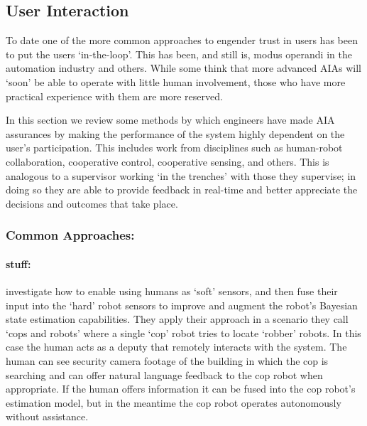 \subsection{User Interaction} \label{sec:user_interaction}
To date one of the more common approaches to engender trust in users has been to put the users `in-the-loop'. This has been, and still is, modus operandi in the automation industry and others. While some think that more advanced AIAs will `soon' be able to operate with little human involvement, those who have more practical experience with them are more reserved.

In this section we review some methods by which engineers have made AIA assurances by making the performance of the system highly dependent on the user's participation. This includes work from disciplines such as human-robot collaboration, cooperative control, cooperative sensing, and others. This is analogous to a supervisor working `in the trenches' with those they supervise; in doing so they are able to provide feedback in real-time and better appreciate the decisions and outcomes that take place.

\subsubsection{Common Approaches:}

\paragraph{stuff:}
\citet{Sweet2016-dw} investigate how to enable using humans as `soft' sensors, and then fuse their input into the `hard' robot sensors to improve and augment the robot's Bayesian state estimation capabilities. They apply their approach in a scenario they call `cops and robots' where a single `cop' robot tries to locate `robber' robots. In this case the human acts as a deputy that remotely interacts with the system. The human can see security camera footage of the building in which the cop is searching and can offer natural language feedback to the cop robot when appropriate. If the human offers information it can be fused into the cop robot's estimation model, but in the meantime the cop robot operates autonomously without assistance.

